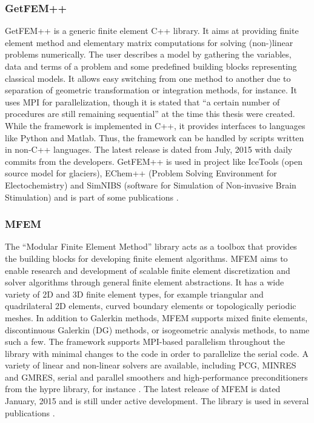   \subsubsection{GetFEM++}
  GetFEM++ \cite{getfempp} is a generic finite element C++ library. It aims at providing finite element method and elementary matrix computations for solving (non-)linear problems numerically. The user describes a model by gathering the variables, data and terms of a problem and some predefined building blocks representing classical models. It allows easy switching from one method to another due to separation of geometric transformation or integration methods, for instance. It uses MPI for parallelization, though it is stated that ``a certain number of procedures are still remaining sequential'' \cite{getfemppMPI} at the time this thesis were created. While the framework is implemented in C++, it provides interfaces to languages like Python and Matlab. Thus, the framework can be handled by scripts written in non-C++ languages. The latest release is dated from July, 2015 with daily commits from the developers. GetFEM++ is used in project like IceTools \cite{icetools} (open source model for glaciers), EChem++ \cite{echempp} (Problem Solving Environment for Electochemistry) and SimNIBS \cite{simnibs} (software for Simulation of Non-invasive Brain Stimulation) and is part of some publications \cite{getfempp}.
  
  
  
  \subsubsection{MFEM}
  The ``Modular Finite Element Method'' library acts as a toolbox that provides the building blocks for developing finite element algorithms. MFEM aims to enable research and development of scalable finite element discretization and solver algorithms through general finite element abstractions. It has a wide variety of 2D and 3D finite element types, for example triangular and quadrilateral 2D elements, curved boundary elements or topologically periodic meshes. In addition to Galerkin methods, MFEM supports mixed finite elements, discontinuous Galerkin (DG) methods, or isogeometric analysis methods, to name such a few. The framework supports MPI-based parallelism throughout the library with minimal changes to the code in order to parallelize the serial code. A variety of linear and non-linear solvers are available, including PCG, MINRES and GMRES, serial and parallel smoothers and high-performance preconditioners from the hypre library, for instance \cite{mfem}. The latest release of MFEM is dated January, 2015 and is still under active development. The library is used in several publications \cite{mfemPubs}.
  
